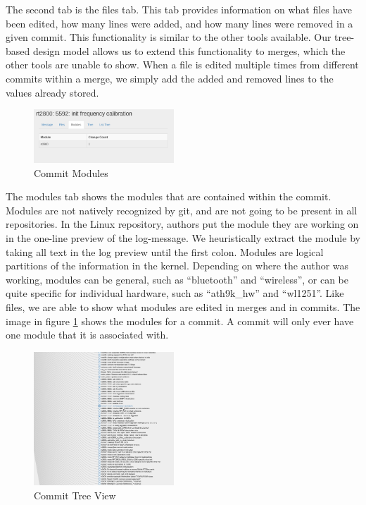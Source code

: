 \documentclass[conference, draftclsnofoot]{IEEEtran}
\begin{document}
The second tab is the files tab. This tab provides information on what files
have been edited, how many lines were added, and how many lines were removed in
a given commit. This functionality is similar to the other tools available. Our
tree-based design model allows us to extend this functionality to merges, which
the other tools are unable to show. When a file is edited multiple times from
different commits within a merge, we simply add the added and removed lines to
the values already stored. 

\begin{figure}[h]
	\centering
	\includegraphics[width=0.47\textwidth]{figures/modules.png}
	\caption{Commit Modules}
	\label{fig:modules}
\end{figure}

The modules tab shows the modules that are contained within the commit. Modules
are not natively recognized by git, and are not going to be present in all
repositories. In the Linux repository, authors put the module they are working
on in the one-line preview of the log-message.  We heuristically extract the
module by taking all text in the log preview until the first colon. Modules are
logical partitions of the information in the kernel. Depending on where the
author was working, modules can be general, such as ``bluetooth'' and
``wireless'', or can be quite specific for individual hardware, such as
``ath9k\_hw'' and ``wl1251''. Like files, we are able to show what modules are
edited in merges and in commits. The image in figure \ref{fig:modules} shows
the modules for a commit. A commit will only ever have one module that it is
associated with.

\begin{figure}[h]
	\centering
	\includegraphics[width=0.47\textwidth]{figures/tree_view.png}
	\caption{Commit Tree View}
	\label{fig:tree}
\end{figure}
\end{document}
